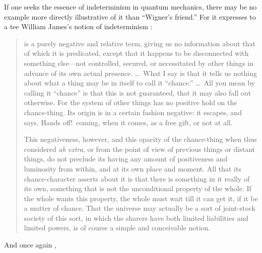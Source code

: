 \documentclass[aps,pra,superscriptaddress,12pt,tightenlines,nofootinbib]{revtex4-2}
\begin{document}
If one seeks the essence of indeterminism in quantum mechanics, there may be no example more directly illustrative of it than ``Wigner's friend.''  For it expresses to a tee William James's notion of indeterminism \cite{James1884}:
\begin{quote}
\noindent [Chance] is a purely negative and relative term, giving us no
information about that of which it is predicated, except that it
happens to be disconnected with something else---not controlled,
secured, or necessitated by other things in advance of its own actual
presence. \ldots\ What I say is that it tells us
nothing about what a thing may be in itself to call it ``chance.'' \ldots\
All you mean by calling it ``chance'' is that this is not guaranteed,
that it may also fall out otherwise. For the system of other things
has no positive hold on the chance-thing. Its origin is in a certain
fashion negative: it escapes, and says, Hands off!\ coming, when it
comes, as a free gift, or not at all.

This negativeness, however, and this opacity of the chance-thing when
thus considered {\it ab extra}, or from the point of view of previous
things or distant things, do not preclude its having any amount of
positiveness and luminosity from within, and at its own place and
moment. All that its chance-character asserts about it is that there
is something in it really of its own, something that is not the
unconditional property of the whole. If the whole wants this
property, the whole must wait till it can get it, if it be a matter
of chance. That the universe may actually be a sort of joint-stock
society of this sort, in which the sharers have both limited
liabilities and limited powers, is of course a simple and conceivable
notion.
\end{quote}
And once again \cite{JamesOSH},
\end{document}
